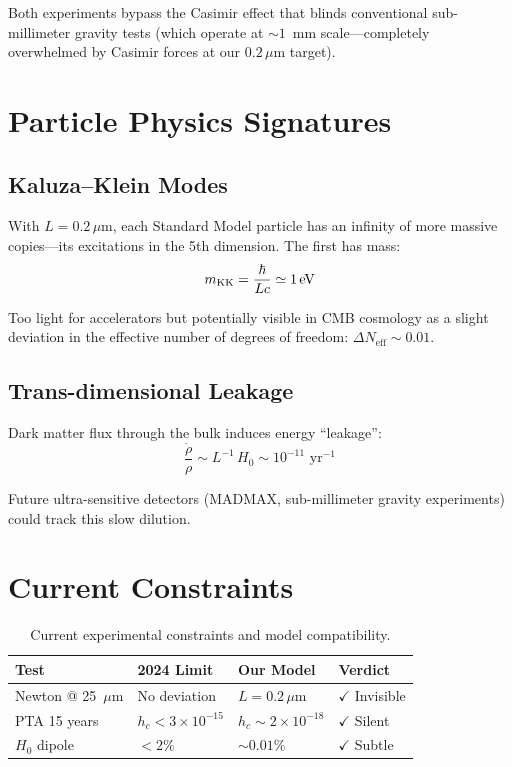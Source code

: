 Both experiments bypass the Casimir effect that blinds conventional sub-millimeter gravity tests (which operate at $\sim 1$~mm scale---completely overwhelmed by Casimir forces at our $0.2\,\mu$m target).

\section{Particle Physics Signatures}
\label{sec:particle_signatures}

\subsection{Kaluza--Klein Modes}

With $L = 0.2\,\mu$m, each Standard Model particle has an infinity of more massive copies---its excitations in the 5th dimension. The first has mass:
\begin{equation}
m_\text{KK} = \frac{\hbar}{Lc} \simeq 1\,\text{eV}
\end{equation}

Too light for accelerators but potentially visible in CMB cosmology as a slight deviation in the effective number of degrees of freedom: $\Delta N_\text{eff} \sim 0.01$.

\subsection{Trans-dimensional Leakage}

Dark matter flux through the bulk induces energy ``leakage'':
\begin{equation}
\frac{\dot{\rho}}{\rho} \sim L^{-1}\,H_0 \sim 10^{-11}\text{ yr}^{-1}
\end{equation}

Future ultra-sensitive detectors (MADMAX, sub-millimeter gravity experiments) could track this slow dilution.

\section{Current Constraints}
\label{sec:current_constraints}

\begin{table}[h]
\centering
\caption{Current experimental constraints and model compatibility.}
\label{tab:constraints}
\begin{tabular}{@{}llll@{}}
\toprule
\textbf{Test} & \textbf{2024 Limit} & \textbf{Our Model} & \textbf{Verdict} \\
\midrule
Newton @ 25~$\mu$m & No deviation & $L = 0.2\,\mu$m & $\checkmark$ Invisible \\
PTA 15 years & $h_c < 3 \times 10^{-15}$ & $h_c \sim 2 \times 10^{-18}$ & $\checkmark$ Silent \\
$H_0$ dipole & $< 2\%$ & $\sim 0.01\%$ & $\checkmark$ Subtle \\
\bottomrule
\end{tabular}
\end{table}

